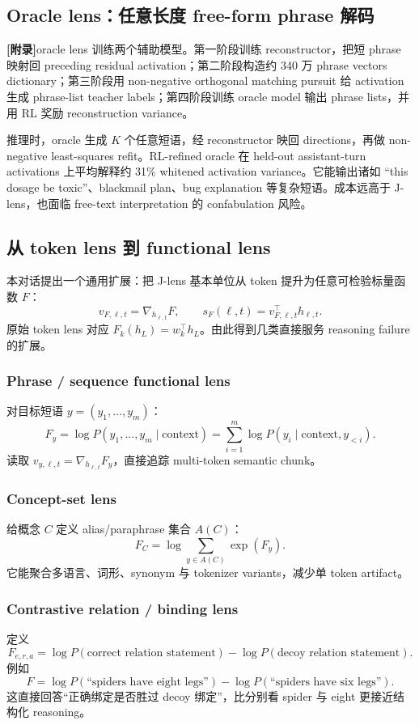 \documentclass[10.5pt,a4paper]{ctexart}
\newcommand{\AppendixTag}{\textbf{[附录]}}
\begin{document}
\subsection{Oracle lens：任意长度 free-form phrase 解码}
\AppendixTag oracle lens 训练两个辅助模型。第一阶段训练 reconstructor，把短 phrase 映射回 preceding residual activation；第二阶段构造约 340 万 phrase vectors dictionary；第三阶段用 non-negative orthogonal matching pursuit 给 activation 生成 phrase-list teacher labels；第四阶段训练 oracle model 输出 phrase lists，并用 RL 奖励 reconstruction variance。

推理时，oracle 生成 $K$ 个任意短语，经 reconstructor 映回 directions，再做 non-negative least-squares refit。RL-refined oracle 在 held-out assistant-turn activations 上平均解释约 31\% whitened activation variance。它能输出诸如 “this dosage be toxic”、blackmail plan、bug explanation 等复杂短语。成本远高于 J-lens，也面临 free-text interpretation 的 confabulation 风险。

\subsection{从 token lens 到 functional lens}
本对话提出一个通用扩展：把 J-lens 基本单位从 token 提升为任意可检验标量函数 $F$：
\[
v_{F,\ell,t}=\nabla_{h_{\ell,t}}F,
\qquad
s_F(\ell,t)=v_{F,\ell,t}^\top h_{\ell,t}.
\]
原始 token lens 对应 $F_k(h_L)=w_k^\top h_L$。由此得到几类直接服务 reasoning failure 的扩展。

\subsubsection{Phrase / sequence functional lens}
对目标短语 $y=(y_1,\ldots,y_m)$：
\[
F_y=\log P(y_1,\ldots,y_m\mid\mathrm{context})
=\sum_{i=1}^m \log P(y_i\mid\mathrm{context},y_{<i}).
\]
读取 $v_{y,\ell,t}=\nabla_{h_{\ell,t}}F_y$，直接追踪 multi-token semantic chunk。

\subsubsection{Concept-set lens}
给概念 $C$ 定义 alias/paraphrase 集合 $A(C)$：
\[
F_C=\log\sum_{y\in A(C)}\exp(F_y).
\]
它能聚合多语言、词形、synonym 与 tokenizer variants，减少单 token artifact。

\subsubsection{Contrastive relation / binding lens}
定义
\[
F_{e,r,a}
=\log P(\text{correct relation statement})
-\log P(\text{decoy relation statement}).
\]
例如
\[
F=\log P(\text{``spiders have eight legs''})
-\log P(\text{``spiders have six legs''}).
\]
这直接回答“正确绑定是否胜过 decoy 绑定”，比分别看 spider 与 eight 更接近结构化 reasoning。
\end{document}
